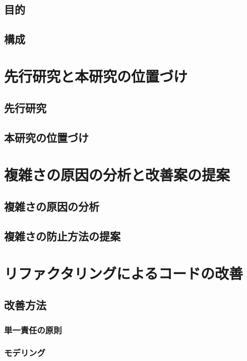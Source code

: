 \documentclass[11pt, a4paper]{jreport}
\begin{document}
\section{目的}
\section{構成}
\chapter{先行研究と本研究の位置づけ}
\section{先行研究}
\subsection{}
\subsection{}
\section{本研究の位置づけ}
\chapter{複雑さの原因の分析と改善案の提案}
\section{複雑さの原因の分析}
\section{複雑さの防止方法の提案}
\chapter{リファクタリングによるコードの改善}
\section{改善方法}
\subsection{単一責任の原則}
\subsection{モデリング}
\end{document}
